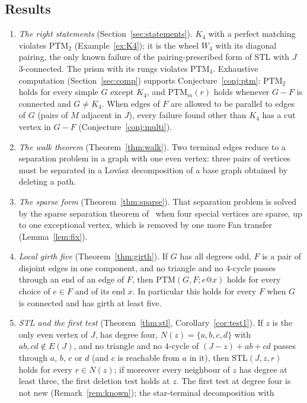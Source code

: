 \documentclass[11pt]{amsart}
\theoremstyle{definition}
\newcommand{\PTM}{\mathrm{PTM}}
\newcommand{\STL}{\mathrm{STL}}
\begin{document}
\subsection*{Results}
\begin{enumerate}[label=(\arabic*)]
\item \emph{The right statements} (Section~\ref{sec:statements}). $K_4$ with a perfect matching
violates $\PTM_2$ (Example~\ref{ex:K4}); it is the wheel $W_4$ with its diagonal pairing, the only
known failure of the pairing-prescribed form of STL with $J$ $3$-connected. The prism with its
rungs violates $\PTM_3$. Exhaustive computation (Section~\ref{sec:comp}) supports
Conjecture~\ref{conj:ptm}: $\PTM_2$ holds for every simple $G$ except $K_4$, and $\PTM_m(r)$ holds
whenever $G-F$ is connected and $G\ne K_4$. When edges of $F$ are allowed to be parallel to edges
of $G$ (pairs of $M$ adjacent in $J$), every failure found other than $K_4$ has a cut vertex in
$G-F$ (Conjecture~\ref{conj:multi}).
\item \emph{The walk theorem} (Theorem~\ref{thm:walk}). Two terminal edges reduce to a
separation problem in a graph with one even vertex: three pairs of vertices must be separated in
a Lov\'asz decomposition of a base graph obtained by deleting a path.
\item \emph{The sparse form} (Theorem~\ref{thm:sparse}). That separation problem is solved by the
sparse separation theorem of~\cite{MS} when four special vertices are sparse, up to one
exceptional vertex, which is removed by one more Fan transfer (Lemma~\ref{lem:fix}).
\item \emph{Local girth five} (Theorem~\ref{thm:girth}). If $G$ has all degrees odd, $F$ is a
pair of disjoint edges in one component, and no triangle and no $4$-cycle passes through an end
of an edge of $F$, then $\PTM(G,F;e@x)$ holds for every choice of $e\in F$ and of its end $x$. In
particular this holds for every $F$ when $G$ is connected and has girth at least five.
\item \emph{STL and the first test} (Theorem~\ref{thm:stl}, Corollary~\ref{cor:test1}). If $z$ is
the only even vertex of $J$, has degree four, $N(z)=\{a,b,c,d\}$ with $ab,cd\notin E(J)$, and no
triangle and no $4$-cycle of $(J-z)+ab+cd$ passes through $a$, $b$, $c$ or $d$ (and $c$ is
reachable from $a$ in it), then $\STL(J,z,r)$ holds for every $r\in N(z)$; if moreover every
neighbour of $z$ has degree at least three, the first deletion test holds at $z$. The first test
at degree four is not new (Remark~\ref{rem:known}); the star-terminal decomposition with

\end{enumerate}
\end{document}
